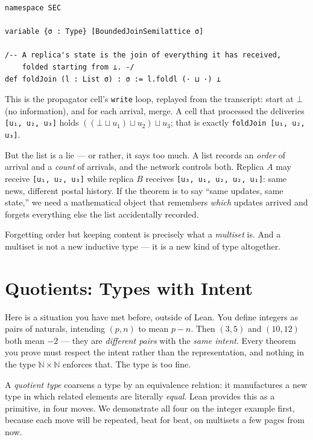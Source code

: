 \documentclass[12pt, a4paper, openright]{book}
\theoremstyle{thmstyle}
\theoremstyle{defstyle}
\newcommand{\lc}[1]{\texttt{#1}}
\begin{document}
\begin{verbatim}
namespace SEC

variable {σ : Type} [BoundedJoinSemilattice σ]

/-- A replica's state is the join of everything it has received,
    folded starting from ⊥. -/
def foldJoin (l : List σ) : σ := l.foldl (· ⊔ ·) ⊥
\end{verbatim}

This is the propagator cell's \lc{write} loop, replayed from the transcript:
start at $\bot$ (no information), and for each arrival, merge. A cell that
processed the deliveries \lc{[u₁, u₂, u₃]} holds
$((\bot \sqcup u_1) \sqcup u_2) \sqcup u_3$; that is exactly
\lc{foldJoin [u₁, u₂, u₃]}.

But the list is a lie --- or rather, it says too much. A list records an
\emph{order} of arrival and a \emph{count} of arrivals, and the network
controls both. Replica $A$ may receive \lc{[u₁, u₂, u₃]} while replica $B$
receives \lc{[u₃, u₁, u₂, u₂, u₁]}: same news, different postal history. If
the theorem is to say ``same updates, same state,'' we need a mathematical
object that remembers \emph{which} updates arrived and forgets everything
else the list accidentally recorded.

Forgetting order but keeping content is precisely what a \emph{multiset}
is. And a multiset is not a new inductive type --- it is a new kind of type
altogether.

\section{Quotients: Types with Intent}
\label{sec:quotients}

Here is a situation you have met before, outside of Lean. You define
integers as pairs of naturals, intending $(p, n)$ to mean $p - n$. Then
$(3, 5)$ and $(10, 12)$ both mean $-2$ --- they are \emph{different pairs}
with the \emph{same intent}. Every theorem you prove must respect the
intent rather than the representation, and nothing in the type
$\mathbb{N} \times \mathbb{N}$ enforces that. The type is too fine.

A \emph{quotient type} coarsens a type by an equivalence relation: it
manufactures a new type in which related elements are literally
\emph{equal}. Lean provides this as a primitive, in four moves. We
demonstrate all four on the integer example first, because each move will
be repeated, beat for beat, on multisets a few pages from now.
\end{document}
